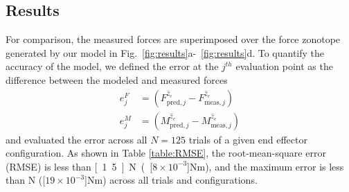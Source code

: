 \subsection{Results}


For comparison, the measured forces are superimposed over the force zonotope generated by our model in Fig.~\ref{fig:results}a-~\ref{fig:results}d.
To quantify the accuracy of the model, we defined the error at the $j^{th}$ evaluation point as the difference between the modeled and measured forces
\begin{align}
    e^F_j &= \left( F^{\hat{z}_e}_{\text{pred}, j} - F^{\hat{z}_e}_{\text{meas}, j} \right) \\
    e^M_j &= \left( M^{\hat{z}_e}_{\text{pred}, j} - M^{\hat{z}_e}_{\text{meas}, j} \right)
\end{align}
and evaluated the error across all $N = 125$ trials of a given end effector configuration.
As shown in Table \ref{table:RMSE}, the root-mean-square error (RMSE) is less than \unit[1.5]{N} (\unit[${8 \times 10^{-3}}$]{Nm}), and the maximum error is less than \unit[3]{N}  (\unit[${19 \times 10^{-3}}$]{Nm}) across all trials and configurations.

